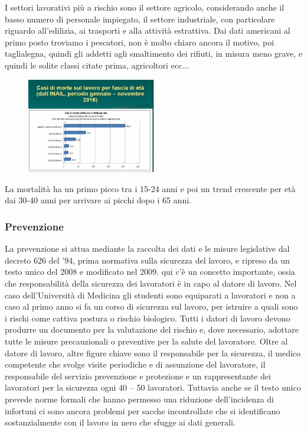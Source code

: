 I settori lavorativi più a rischio sono il settore agricolo,
considerando anche il basso numero di personale impiegato, il settore
industriale, con particolare riguardo all'edilizia, ai trasporti e alla
attività estrattiva. Dai dati americani al primo posto troviamo i
pescatori, non è molto chiaro ancora il motivo, poi taglialegna, quindi
gli addetti agli smaltimento dei rifiuti, in misura meno grave, e quindi
le solite classi citate prima, agricoltori ecc...

\begin{figure}[!ht]
\centering
	\includegraphics[width=0.5\textwidth]{28/image9.jpg}
	\end{figure}

La mortalità ha un primo picco tra i 15-24 anni e poi un trend crescente
per età dai 30-40 anni per arrivare ai picchi dopo i 65 anni.

\subsubsection{Prevenzione}

La prevenzione si attua mediante la raccolta dei dati e le misure
legislative dal decreto 626 del '94, prima normativa sulla sicurezza del
lavoro, e ripreso da un testo unico del 2008 e modificato nel 2009. qui
c'è un concetto importante, ossia che responsabilità della sicurezza dei
lavoratori è in capo al datore di lavoro. Nel caso dell'Università di
Medicina gli studenti sono equiparati a lavoratori e non a caso al primo
anno si fa un corso di sicurezza sul lavoro, per istruire a quali sono i
rischi come cattiva postura o rischio biologico. Tutti i datori di
lavoro devono produrre un documento per la valutazione del rischio e,
dove necessario, adottare tutte le misure precauzionali o preventive per
la salute del lavoratore. Oltre al datore di lavoro, altre figure chiave
sono il responsabile per la sicurezza, il medico competente che svolge
visite periodiche e di assunzione del lavoratore, il responsabile del
servizio prevenzione e protezione e un rappresentante dei lavoratori per
la sicurezza ogni 40 -- 50 lavoratori. Tuttavia anche se il testo unico
prevede norme formali che hanno permesso una riduzione dell'incidenza di
infortuni ci sono ancora problemi per sacche incontrollate che si
identificano sostanzialmente con il lavoro in nero che sfugge ai dati
generali.

